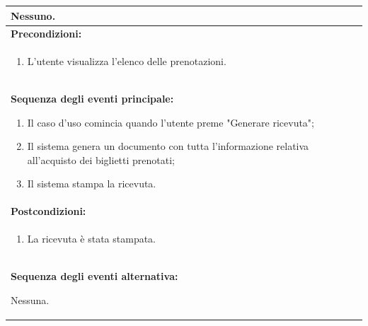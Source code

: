 \documentclass{article}
\begin{document}
\begin{table}[t]
\begin{tabular}{|p{\linewidth}|}
                        Nessuno. \\
                        \hline
                        \cellcolor{gray!20}
                        \textbf{Precondizioni:} \\
                        \cellcolor{gray!20}
                        \begin{minipage}{\linewidth}
                            \begin{enumerate}
                                \item L'utente visualizza l'elenco delle prenotazioni. %
                            \end{enumerate}
                        \end{minipage} \\
                        \hline
                        \textbf{Sequenza degli eventi principale:}
                        \begin{enumerate}
                            \item Il caso d'uso comincia quando l'utente preme "Generare ricevuta";
                            \item Il sistema genera un documento con tutta l'informazione relativa all'acquisto dei biglietti prenotati;
                            \item Il sistema stampa la ricevuta.
                        \end{enumerate} \\
                        \hline
                        \cellcolor{gray!20}
                        \textbf{Postcondizioni:} \\
                        \cellcolor{gray!20}
                        \begin{minipage}{\linewidth}
                            \begin{enumerate}
                                \item La ricevuta è stata stampata.
                            \end{enumerate}
                        \end{minipage} \\
                        \hline
                        \textbf{Sequenza degli eventi alternativa:}
                        
                        Nessuna. \\
                        \hline
                    \end{tabular}
                \end{table}
\end{document}
